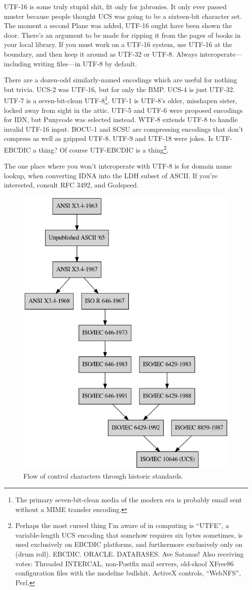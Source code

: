 UTF-16 is some truly stupid shit, fit only for jabronies. It only ever passed
muster because people thought UCS was going to be a sixteen-bit character set.
The moment a second Plane was added, UTF-16 ought have been shown the door.
There's an argument to be made for ripping it from the pages of books
in your local library. If you must work on a UTF-16
system, use UTF-16 at the boundary, and then keep it around as UTF-32 or UTF-8.
Always interoperate---including writing files---in UTF-8 by default.

There are a dozen-odd similarly-named encodings which are useful for nothing
but trivia. UCS-2 was UTF-16, but for only the BMP. UCS-4 is just UTF-32. UTF-7
is a seven-bit-clean UTF-8\footnote{The primary seven-bit-clean media of the
modern era is probably email sent without a MIME transfer encoding.}. UTF-1 is UTF-8's older, misshapen sister, locked away from
sight in the attic. UTF-5 and UTF-6 were proposed encodings for IDN, but
Punycode was selected instead. WTF-8 extends UTF-8 to handle invalid UTF-16
input. BOCU-1 and SCSU are compressing encodings that
don't compress as well as gzipped UTF-8. UTF-9 and UTF-18 were jokes. Is
UTF-EBCDIC a thing? Of course UTF-EBCDIC is a thing\footnote{Perhaps the
most cursed thing I'm aware of in computing is
``UTFE'', a variable-length UCS encoding that somehow requires six bytes
sometimes, is used exclusively on EBCDIC platforms, and furthermore exclusively
only on (drum roll)\textellipsis. EBCDIC. ORACLE. DATABASES. Ave Satanas! Also receiving
votes: Threaded INTERCAL, non-Postfix mail servers, old-skool XFree86 configuration
files with the modeline bullshit, ActiveX controls, ``WebNFS'', Perl.}.

The one place where you won't interoperate with UTF-8 is for domain name lookup,
when converting IDNA into the LDH subset of ASCII. If you're interested,
consult RFC 3492, and Godspeed.

\begin{figure}[!htb]
    \centering
    \includegraphics[width=.75\linewidth]{media/control-char-standards.png}
    \caption{Flow of control characters through historic standards.}
\end{figure}

\cleardoublepage
